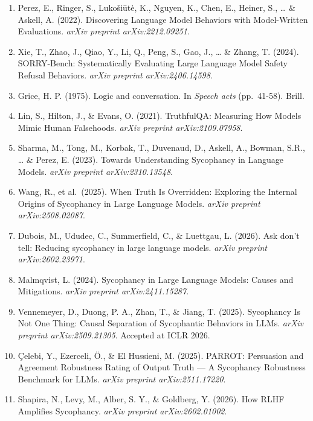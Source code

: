 \documentclass[
]{article}
\begin{document}
\begin{enumerate}
\def\labelenumi{\arabic{enumi}.}
\item
  Perez, E., Ringer, S., Lukošiūtė, K., Nguyen, K., Chen, E., Heiner,
  S., \ldots{} \& Askell, A. (2022). Discovering Language Model
  Behaviors with Model-Written Evaluations. \emph{arXiv preprint
  arXiv:2212.09251}.
\item
  Xie, T., Zhao, J., Qiao, Y., Li, Q., Peng, S., Gao, J., \ldots{} \&
  Zhang, T. (2024). SORRY-Bench: Systematically Evaluating Large
  Language Model Safety Refusal Behaviors. \emph{arXiv preprint
  arXiv:2406.14598}.
\item
  Grice, H. P. (1975). Logic and conversation. In \emph{Speech acts}
  (pp.~41-58). Brill.
\item
  Lin, S., Hilton, J., \& Evans, O. (2021). TruthfulQA: Measuring How
  Models Mimic Human Falsehoods. \emph{arXiv preprint arXiv:2109.07958}.
\item
  Sharma, M., Tong, M., Korbak, T., Duvenaud, D., Askell, A., Bowman,
  S.R., \ldots{} \& Perez, E. (2023). Towards Understanding Sycophancy
  in Language Models. \emph{arXiv preprint arXiv:2310.13548}.
\item
  Wang, R., et al.~(2025). When Truth Is Overridden: Exploring the
  Internal Origins of Sycophancy in Large Language Models. \emph{arXiv
  preprint arXiv:2508.02087}.
\item
  Dubois, M., Ududec, C., Summerfield, C., \& Luettgau, L. (2026). Ask
  don't tell: Reducing sycophancy in large language models. \emph{arXiv
  preprint arXiv:2602.23971}.
\item
  Malmqvist, L. (2024). Sycophancy in Large Language Models: Causes and
  Mitigations. \emph{arXiv preprint arXiv:2411.15287}.
\item
  Vennemeyer, D., Duong, P. A., Zhan, T., \& Jiang, T. (2025).
  Sycophancy Is Not One Thing: Causal Separation of Sycophantic
  Behaviors in LLMs. \emph{arXiv preprint arXiv:2509.21305}. Accepted at
  ICLR 2026.
\item
  Çelebi, Y., Ezerceli, Ö., \& El Hussieni, M. (2025). PARROT:
  Persuasion and Agreement Robustness Rating of Output Truth --- A
  Sycophancy Robustness Benchmark for LLMs. \emph{arXiv preprint
  arXiv:2511.17220}.
\item
  Shapira, N., Levy, M., Alber, S. Y., \& Goldberg, Y. (2026). How RLHF
  Amplifies Sycophancy. \emph{arXiv preprint arXiv:2602.01002}.
\end{enumerate}
\end{document}
